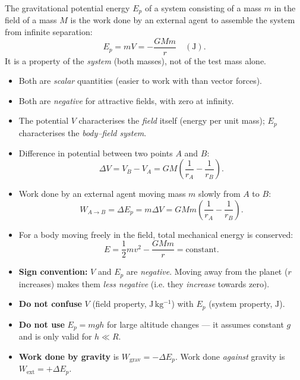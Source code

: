 \documentclass[11pt]{article}
\begin{document}
\begin{definition}
The gravitational potential energy $E_p$ of a system consisting of a mass $m$ in the field of a mass $M$ is the work done by an external agent to assemble the system from infinite separation:
\[ E_p = mV = -\frac{GMm}{r} \quad (\mathrm{J}). \]
It is a property of the \emph{system} (both masses), not of the test mass alone.
\end{definition}

\begin{propriete}
\begin{itemize}
\item Both are \emph{scalar} quantities (easier to work with than vector forces).
\item Both are \emph{negative} for attractive fields, with zero at infinity.
\item The potential $V$ characterises the \emph{field} itself (energy per unit mass); $E_p$ characterises the \emph{body–field system}.
\item Difference in potential between two points $A$ and $B$:
\[ \Delta V = V_B - V_A = GM\left(\frac{1}{r_A} - \frac{1}{r_B}\right). \]
\item Work done by an external agent moving mass $m$ slowly from $A$ to $B$:
\[ W_{A\to B} = \Delta E_p = m\Delta V = GMm\left(\frac{1}{r_A} - \frac{1}{r_B}\right). \]
\item For a body moving freely in the field, total mechanical energy is conserved:
\[ E = \frac{1}{2}mv^{2} - \frac{GMm}{r} = \text{constant}. \]
\end{itemize}
\end{propriete}

\begin{attention}
\begin{itemize}
\item \textbf{Sign convention:} $V$ and $E_p$ are \emph{negative}. Moving away from the planet ($r$ increases) makes them \emph{less negative} (i.e. they \emph{increase} towards zero).
\item \textbf{Do not confuse} $V$ (field property, $\mathrm{J\,kg^{-1}}$) with $E_p$ (system property, $\mathrm{J}$).
\item \textbf{Do not use} $E_p = mgh$ for large altitude changes — it assumes constant $g$ and is only valid for $h \ll R$.
\item \textbf{Work done by gravity} is $W_{\text{grav}} = -\Delta E_p$. Work done \emph{against} gravity is $W_{\text{ext}} = +\Delta E_p$.
\end{itemize}
\end{attention}
\end{document}
